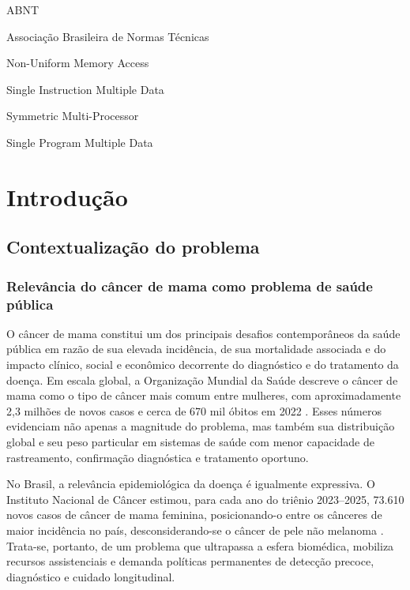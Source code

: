 \documentclass[tcc,capa]{texufpel}
\begin{document}
\listoffigures

\listoftables

\begin{listofabbrv}{ABNT}%
        \item[ABNT] Associação Brasileira de Normas Técnicas
        \item[NUMA] Non-Uniform Memory Access
        \item[SIMD] Single Instruction Multiple Data
        \item[SMP] Symmetric Multi-Processor
        \item[SPMD] Single Program Multiple Data
\end{listofabbrv}

\tableofcontents

\chapter{Introdução}

\section{Contextualização do problema}

\subsection{Relevância do câncer de mama como problema de saúde pública}

O câncer de mama constitui um dos principais desafios contemporâneos da saúde pública em razão de sua elevada incidência, de sua mortalidade associada e do impacto clínico, social e econômico decorrente do diagnóstico e do tratamento da doença. Em escala global, a Organização Mundial da Saúde descreve o câncer de mama como o tipo de câncer mais comum entre mulheres, com aproximadamente 2,3 milhões de novos casos e cerca de 670 mil óbitos em 2022 \cite{WHO2025,IARC2025}. Esses números evidenciam não apenas a magnitude do problema, mas também sua distribuição global e seu peso particular em sistemas de saúde com menor capacidade de rastreamento, confirmação diagnóstica e tratamento oportuno.

No Brasil, a relevância epidemiológica da doença é igualmente expressiva. O Instituto Nacional de Câncer estimou, para cada ano do triênio 2023--2025, 73.610 novos casos de câncer de mama feminina, posicionando-o entre os cânceres de maior incidência no país, desconsiderando-se o câncer de pele não melanoma \cite{INCA2023,INCAIncidencia}. Trata-se, portanto, de um problema que ultrapassa a esfera biomédica, mobiliza recursos assistenciais e demanda políticas permanentes de detecção precoce, diagnóstico e cuidado longitudinal.
\end{document}
